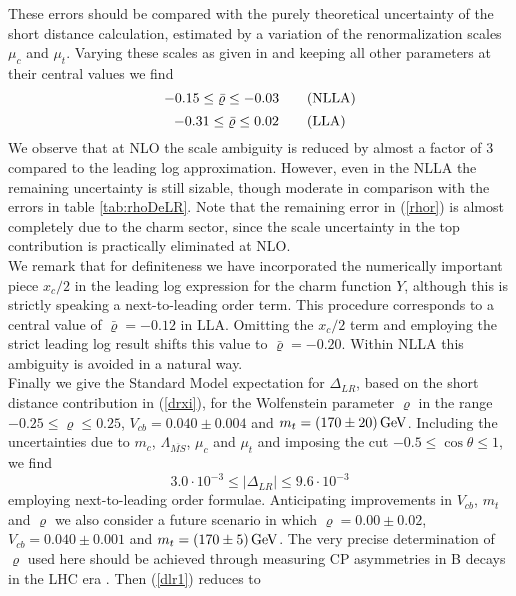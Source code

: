 These errors should be compared with the purely theoretical uncertainty
of the short distance calculation, estimated by a variation of the
renormalization scales $\mu_c$ and $\mu_t$. Varying these scales as given
in  and keeping all other parameters at their central
values we find
\begin{equation}\label{rhor}
-0.15\leq\bar\varrho\leq -0.03 \qquad {\rm (NLLA)}   
\end{equation}
\begin{equation}\label{rhor0num}
-0.31\leq\bar\varrho\leq 0.02 \qquad {\rm (LLA)}   
\end{equation}
We observe that at NLO the scale ambiguity is reduced by almost a
factor of 3 compared to the leading log approximation. However, even in
the NLLA the remaining uncertainty is still sizable, though moderate in
comparison with the errors in table \ref{tab:rhoDeLR}.  Note that the
remaining error in (\ref{rhor}) is almost completely due to the charm
sector, since the scale uncertainty in the top contribution is
practically eliminated at NLO.
\\
We remark that for definiteness we have incorporated the numerically 
important piece $x_c/2$ in the leading log expression for the
charm function $Y$, although this is strictly speaking a next-to-leading
order term. This procedure corresponds to a central value of
$\bar\varrho=-0.12$ in LLA. Omitting the $x_c/2$ term and employing the
strict leading log result shifts this value to $\bar\varrho=-0.20$.
Within NLLA this ambiguity is avoided in a natural way.
\\
Finally we give the Standard Model expectation for $\Delta_{LR}$,
based on the short distance contribution in (\ref{drxi}), for the
Wolfenstein parameter $\varrho$ in the range
$-0.25\leq\varrho\leq 0.25$, $V_{cb}=0.040\pm 0.004$ and
$m_t=(170\pm 20)\, {\rm GeV}$. Including the uncertainties due to
$m_c$, $\Lambda_{\overline{MS}}$, $\mu_c$ and $\mu_t$ and
imposing the cut $-0.5\leq\cos\theta\leq 1$, we find
\begin{equation}\label{dlr1}
3.0\cdot 10^{-3}\leq |\Delta_{LR}|\leq 9.6\cdot 10^{-3}   
\end{equation}
employing next-to-leading order formulae.
Anticipating improvements in $V_{cb}$, $m_t$ and $\varrho$ we also
consider a future scenario in which
$\varrho=0.00\pm 0.02$, $V_{cb}=0.040\pm 0.001$ and
$m_t=(170\pm 5)\, {\rm GeV}$. The very precise determination of $\varrho$
used here should be achieved through measuring CP asymmetries
in B decays in the LHC era \cite{buras:94b}. Then (\ref{dlr1}) reduces to
